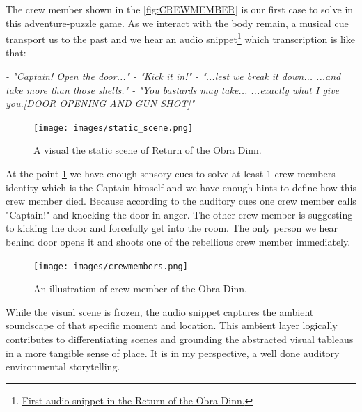             The crew member shown in the \ref{fig:CREWMEMBER} is our first case to solve in this adventure-puzzle game. As we interact with the body remain, a musical cue transport us to the past and we hear an audio snippet\footnote{\href{https://youtu.be/UXC6Sjsedcg}{First audio snippet in the Return of the Obra Dinn.}} which transcription is like that:\par
            \emph{
                \newline
                - "Captain! Open the door..."\newline
                - "Kick it in!"\newline
                - "...lest we break it down... ...and take more than those shells."\newline
                - "You bastards may take... ...exactly what I give you.[DOOR OPENING AND GUN SHOT]"\newline
                }

            \begin{figure}[H]
                \centering
                \texttt{[image: images/static\_scene.png]}
                \caption{A visual the static scene of Return of the Obra Dinn.}
                \label{fig:STATICSCENE}
            \end{figure}            

            At the point \ref{fig:STATICSCENE} we have enough sensory cues to solve at least 1 crew members identity which is the Captain himself and we have enough hints to define how this crew member died. Because according to the auditory cues one crew member calls "Captain!" and knocking the door in anger. The other crew member is suggesting to kicking the door and forcefully get into the room. The only person we hear behind door opens it and shoots one of the rebellious crew member immediately.\par

            \begin{figure}[H]
                \centering
                \texttt{[image: images/crewmembers.png]}
                \caption{An illustration of crew member of the Obra Dinn.}
                \label{fig:SHIPCREW}
            \end{figure}   

            While the visual scene is frozen, the audio snippet captures the ambient soundscape of that specific moment and location. This ambient layer logically contributes to differentiating scenes and grounding the abstracted visual tableaus in a more tangible sense of place. It is in my perspective, a well done auditory environmental storytelling.\par           

